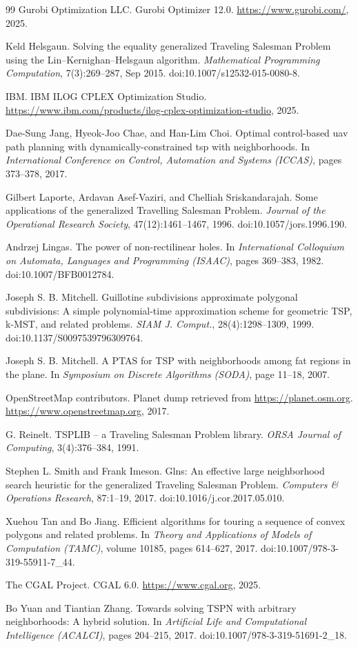 \documentclass[11pt,a4paper]{article}
\theoremstyle{plain}
\begin{document}
\begin{thebibliography}{99}
 Gurobi Optimization LLC. Gurobi Optimizer 12.0. \url{https://www.gurobi.com/}, 2025.

 Keld Helsgaun. Solving the equality generalized Traveling Salesman Problem using the Lin–Kernighan–Helsgaun algorithm. \emph{Mathematical Programming Computation}, 7(3):269--287, Sep 2015. doi:10.1007/s12532-015-0080-8.

 IBM. IBM ILOG CPLEX Optimization Studio. \url{https://www.ibm.com/products/ilog-cplex-optimization-studio}, 2025.

 Dae-Sung Jang, Hyeok-Joo Chae, and Han-Lim Choi. Optimal control-based uav path planning with dynamically-constrained tsp with neighborhoods. In \emph{International Conference on Control, Automation and Systems (ICCAS)}, pages 373--378, 2017.

 Gilbert Laporte, Ardavan Asef-Vaziri, and Chelliah Sriskandarajah. Some applications of the generalized Travelling Salesman Problem. \emph{Journal of the Operational Research Society}, 47(12):1461--1467, 1996. doi:10.1057/jors.1996.190.

 Andrzej Lingas. The power of non-rectilinear holes. In \emph{International Colloquium on Automata, Languages and Programming (ISAAC)}, pages 369--383, 1982. doi:10.1007/BFB0012784.

 Joseph S. B. Mitchell. Guillotine subdivisions approximate polygonal subdivisions: A simple polynomial-time approximation scheme for geometric TSP, k-MST, and related problems. \emph{SIAM J. Comput.}, 28(4):1298--1309, 1999. doi:10.1137/S0097539796309764.

 Joseph S. B. Mitchell. A PTAS for TSP with neighborhoods among fat regions in the plane. In \emph{Symposium on Discrete Algorithms (SODA)}, page 11--18, 2007.

 OpenStreetMap contributors. Planet dump retrieved from \url{https://planet.osm.org}. \url{https://www.openstreetmap.org}, 2017.

 G. Reinelt. TSPLIB -- a Traveling Salesman Problem library. \emph{ORSA Journal of Computing}, 3(4):376--384, 1991.

 Stephen L. Smith and Frank Imeson. Glns: An effective large neighborhood search heuristic for the generalized Traveling Salesman Problem. \emph{Computers \& Operations Research}, 87:1--19, 2017. doi:10.1016/j.cor.2017.05.010.

 Xuehou Tan and Bo Jiang. Efficient algorithms for touring a sequence of convex polygons and related problems. In \emph{Theory and Applications of Models of Computation (TAMC)}, volume 10185, pages 614--627, 2017. doi:10.1007/978-3-319-55911-7\_44.

 The CGAL Project. CGAL 6.0. \url{https://www.cgal.org}, 2025.

 Bo Yuan and Tiantian Zhang. Towards solving TSPN with arbitrary neighborhoods: A hybrid solution. In \emph{Artificial Life and Computational Intelligence (ACALCI)}, pages 204--215, 2017. doi:10.1007/978-3-319-51691-2\_18.

\end{thebibliography}
\end{document}
